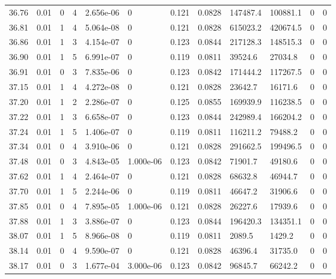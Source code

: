 \documentclass[preview]{standalone}
\begin{document}
{{{{{{{{{{\begin{tabular}{L{1.2cm}C{1.2cm} C{0.3cm}C{0.5cm} C{1.4cm}C{1.4cm} C{1.4cm}C{1.4cm} C{1.6cm}C{1.6cm} C{1.6cm}C{1.6cm}}
  36.76  &  0.01  & 0     &  4 &  2.656e-06  & 0  &  0.121&   0.0828& 147487.4 & 100881.1   &  0 & 0  \\ 
  36.81  &  0.01  & 1     &  4 &  5.064e-08  & 0  &  0.121&   0.0828& 615023.2 & 420674.5   &  0 & 0  \\ 
  36.86  &  0.01  & 1     &  3 &  4.154e-07  & 0  &  0.123&   0.0844& 217128.3 & 148515.3   &  0 & 0  \\ 
  36.90  &  0.01  & 1     &  5 &  6.991e-07  & 0  &  0.119&   0.0811& 39524.6 & 27034.8   &  0 & 0  \\ 
  36.91  &  0.01  & 0     &  3 &  7.835e-06  & 0  &  0.123&   0.0842& 171444.2 & 117267.5   &  0 & 0  \\ 
  37.15  &  0.01  & 1     &  4 &  4.272e-08  & 0  &  0.121&   0.0828& 23642.7 & 16171.6   &  0 & 0  \\ 
  37.20  &  0.01  & 1     &  2 &  2.286e-07  & 0  &  0.125&   0.0855& 169939.9 & 116238.5   &  0 & 0  \\ 
  37.22  &  0.01  & 1     &  3 &  6.658e-07  & 0  &  0.123&   0.0844& 242989.4 & 166204.2   &  0 & 0  \\ 
  37.24  &  0.01  & 1     &  5 &  1.406e-07  & 0  &  0.119&   0.0811& 116211.2 & 79488.2   &  0 & 0  \\ 
  37.34  &  0.01  & 0     &  4 &  3.910e-06  & 0  &  0.121&   0.0828& 291662.5 & 199496.5   &  0 & 0  \\ 
  37.48  &  0.01  & 0     &  3 &  4.843e-05  & 1.000e-06  &  0.123&   0.0842& 71901.7 & 49180.6   &  0 & 0  \\ 
  37.62  &  0.01  & 1     &  4 &  2.464e-07  & 0  &  0.121&   0.0828& 68632.8 & 46944.7   &  0 & 0  \\ 
  37.70  &  0.01  & 1     &  5 &  2.244e-06  & 0  &  0.119&   0.0811& 46647.2 & 31906.6   &  0 & 0  \\ 
  37.85  &  0.01  & 0     &  4 &  7.895e-05  & 1.000e-06  &  0.121&   0.0828& 26227.6 & 17939.6   &  0 & 0  \\ 
  37.88  &  0.01  & 1     &  3 &  3.886e-07  & 0  &  0.123&   0.0844& 196420.3 & 134351.1   &  0 & 0  \\ 
  38.07  &  0.01  & 1     &  5 &  8.966e-08  & 0  &  0.119&   0.0811& 2089.5 & 1429.2   &  0 & 0  \\ 
  38.14  &  0.01  & 0     &  4 &  9.590e-07  & 0  &  0.121&   0.0828& 46396.4 & 31735.0   &  0 & 0  \\ 
  38.17  &  0.01  & 0     &  3 &  1.677e-04  & 3.000e-06  &  0.123&   0.0842& 96845.7 & 66242.2   &  0 & 0  \\ 

\end{tabular}}}}}}}}}}}
\end{document}
